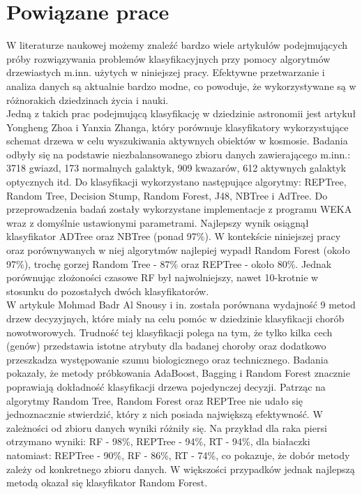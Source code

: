 \documentclass[conference]{IEEEtran}
\begin{document}
\section{Powiązane prace}
	W literaturze naukowej możemy znaleźć bardzo wiele artykułów podejmujących próby rozwiązywania problemów klasyfikacyjnych przy pomocy algorytmów drzewiastych m.inn. użytych w niniejszej pracy. Efektywne przetwarzanie i analiza danych są aktualnie bardzo modne, co powoduje, że wykorzystywane są w różnorakich dziedzinach życia i nauki.\\ 
\indent	Jedną z takich prac podejmującą klasyfikację w dziedzinie astronomii jest artykuł Yongheng Zhoa i Yanxia Zhanga, który porównuje klasyfikatory wykorzystujące schemat drzewa w celu wyszukiwania aktywnych obiektów w kosmosie. Badania odbyły się na podstawie niezbalansowanego zbioru danych zawierającego m.inn.: 3718 gwiazd, 173 normalnych galaktyk, 909 kwazarów, 612 aktywnych galaktyk optycznych itd. Do klasyfikacji wykorzystano następujące algorytmy: REPTree, Random Tree, Decision Stump, Random Forest, J48, NBTree i AdTree. Do przeprowadzenia badań zostały wykorzystane implementacje z programu WEKA wraz z domyślnie ustawionymi parametrami. Najlepszy wynik osiągnął klasyfikator ADTree oraz NBTree (ponad 97\%). W kontekście niniejszej pracy oraz porównywanych w niej algorytmów najlepiej wypadł Random Forest (około 97\%), trochę gorzej Random Tree - 87\% oraz REPTree - około 80\%. Jednak porównując złożoności czasowe RF był najwolniejszy, nawet 10-krotnie w stosunku do pozostałych dwóch klasyfikatorów. \cite{b1} \\
\indent W artykule Mohmad Badr Al Snousy i in. została porównana wydajność 9 metod drzew decyzyjnych, które miały na celu pomóc w dziedzinie klasyfikacji chorób nowotworowych. Trudność tej klasyfikacji polega na tym, że tylko kilka cech (genów) przedstawia istotne atrybuty dla badanej choroby oraz dodatkowo przeszkadza występowanie szumu biologicznego oraz technicznego. Badania pokazały, że metody próbkowania AdaBoost, Bagging i Random Forest znacznie poprawiają dokładność klasyfikacji drzewa pojedynczej decyzji. Patrząc na algorytmy Random Tree, Random Forest oraz REPTree nie udało się jednoznacznie stwierdzić, który z nich posiada największą efektywność. W zależności od zbioru danych wyniki różniły się. Na przykład dla raka piersi otrzymano wyniki: RF - 98\%, REPTree - 94\%, RT - 94\%, dla białaczki natomiast: REPTree - 90\%, RF - 86\%, RT - 74\%, co pokazuje, że dobór metody zależy od konkretnego zbioru danych. W większości przypadków jednak najlepszą metodą okazał się klasyfikator Random Forest. \cite{b4} \\
\end{document}
